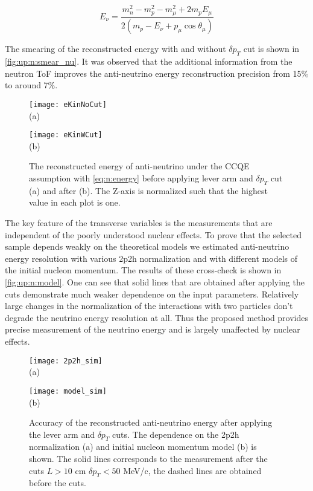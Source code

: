 \documentclass[main.tex]{subfiles}
\begin{document}
\begin{equation}
  \label{eq:n:energy}
  E_\nu=\frac{m^2_n-m^2_p-m^2_\mu+2m_p E_\mu}{2\left(m_p-E_\nu+p_\mu \cos\theta_\mu\right)}
\end{equation}

The smearing of the reconstructed energy with and without $\delta p_T$ cut is shown in \autoref{fig:up:n:smear_nu}. It was observed that the additional information from the neutron ToF improves the anti-neutrino energy reconstruction precision from 15\% to around 7\%.

\begin{figure}[!ht]
  \centering
  \begin{minipage}{0.49\linewidth}
    \centering
    \texttt{[image: eKinNoCut]} \\ (a)
  \end{minipage}
  \begin{minipage}{0.49\linewidth}
    \centering
    \texttt{[image: eKinWCut]} \\ (b)
  \end{minipage}
  \caption{The reconstructed energy of anti-neutrino under the CCQE assumption with \autoref{eq:n:energy} before applying lever arm and $\delta p_T$ cut (a) and after (b). The Z-axis is normalized such that the highest value in each plot is one.}
  \label{fig:up:n:smear_nu}
\end{figure}

The key feature of the transverse variables is the measurements that are independent of the poorly understood nuclear effects. To prove that the selected sample depends weakly on the theoretical models we estimated anti-neutrino energy resolution with various 2p2h normalization and with different models of the initial nucleon momentum. The results of these cross-check is shown in \autoref{fig:up:n:model}. One can see that solid lines that are obtained after applying the cuts demonstrate much weaker dependence on the input parameters. Relatively large changes in the normalization of the interactions with two particles don't degrade the neutrino energy resolution at all. Thus the proposed method provides precise measurement of the neutrino energy and is largely unaffected by nuclear effects.

\begin{figure}[!ht]
  \centering
  \begin{minipage}{0.49\linewidth}
    \centering
    \texttt{[image: 2p2h\_sim]} \\ (a)
  \end{minipage}
  \begin{minipage}{0.49\linewidth}
    \centering
    \texttt{[image: model\_sim]} \\ (b)
  \end{minipage}
  \caption{Accuracy of the reconstructed anti-neutrino energy after applying the lever arm and $\delta p_T$ cuts. The dependence on the 2p2h normalization (a) and initial nucleon momentum model (b) is shown. The solid lines corresponds to the measurement after the cuts $L>10$ cm $\delta p_T < 50$ MeV/c, the dashed lines are obtained before the cuts.}
  \label{fig:up:n:model}
\end{figure}
\end{document}
